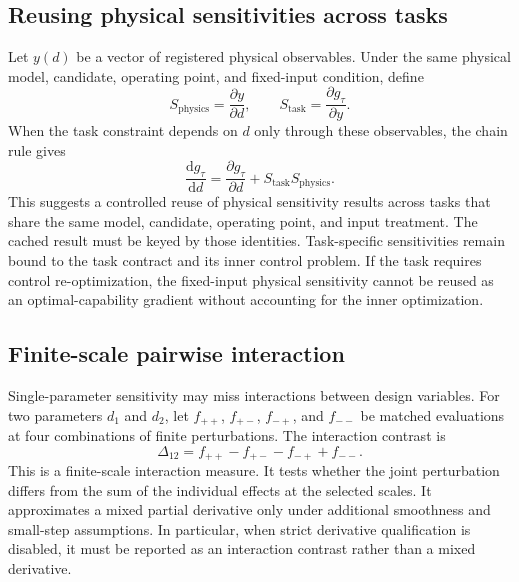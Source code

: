 \subsection{Reusing physical sensitivities across tasks}

Let $y(d)$ be a vector of registered physical observables. Under the same physical model, candidate, operating point, and fixed-input condition, define
\begin{equation}
S_{\mathrm{physics}}=\frac{\partial y}{\partial d},
\qquad
S_{\mathrm{task}}=\frac{\partial g_\tau}{\partial y}.
\end{equation}
When the task constraint depends on $d$ only through these observables, the chain rule gives
\begin{equation}
\frac{\mathrm d g_\tau}{\mathrm d d}
=
\frac{\partial g_\tau}{\partial d}
+
S_{\mathrm{task}}S_{\mathrm{physics}}.
\label{eq:cross-task-chain}
\end{equation}
This suggests a controlled reuse of physical sensitivity results across tasks that share the same model, candidate, operating point, and input treatment. The cached result must be keyed by those identities. Task-specific sensitivities remain bound to the task contract and its inner control problem. If the task requires control re-optimization, the fixed-input physical sensitivity cannot be reused as an optimal-capability gradient without accounting for the inner optimization.

\subsection{Finite-scale pairwise interaction}

Single-parameter sensitivity may miss interactions between design variables. For two parameters $d_1$ and $d_2$, let $f_{++}$, $f_{+-}$, $f_{-+}$, and $f_{--}$ be matched evaluations at four combinations of finite perturbations. The interaction contrast is
\begin{equation}
\Delta_{12}
=f_{++}-f_{+-}-f_{-+}+f_{--}.
\label{eq:interaction}
\end{equation}
This is a finite-scale interaction measure. It tests whether the joint perturbation differs from the sum of the individual effects at the selected scales. It approximates a mixed partial derivative only under additional smoothness and small-step assumptions. In particular, when strict derivative qualification is disabled, it must be reported as an interaction contrast rather than a mixed derivative.

